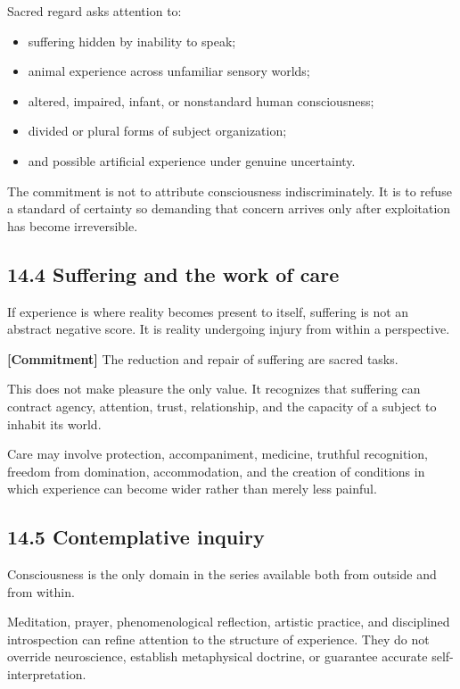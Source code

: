 \documentclass[
  11pt,
]{article}
\providecommand{\tightlist}{%
  \setlength{\itemsep}{0pt}\setlength{\parskip}{0pt}}
\begin{document}
Sacred regard asks attention to:

\begin{itemize}
\tightlist
\item
  suffering hidden by inability to speak;
\item
  animal experience across unfamiliar sensory worlds;
\item
  altered, impaired, infant, or nonstandard human consciousness;
\item
  divided or plural forms of subject organization;
\item
  and possible artificial experience under genuine uncertainty.
\end{itemize}

The commitment is not to attribute consciousness indiscriminately. It is
to refuse a standard of certainty so demanding that concern arrives only
after exploitation has become irreversible.

\subsection{14.4 Suffering and the work of
care}\label{suffering-and-the-work-of-care}

If experience is where reality becomes present to itself, suffering is
not an abstract negative score. It is reality undergoing injury from
within a perspective.

\textbf{{[}Commitment{]}} The reduction and repair of suffering are
sacred tasks.

This does not make pleasure the only value. It recognizes that suffering
can contract agency, attention, trust, relationship, and the capacity of
a subject to inhabit its world.

Care may involve protection, accompaniment, medicine, truthful
recognition, freedom from domination, accommodation, and the creation of
conditions in which experience can become wider rather than merely less
painful.

\subsection{14.5 Contemplative inquiry}\label{contemplative-inquiry}

Consciousness is the only domain in the series available both from
outside and from within.

Meditation, prayer, phenomenological reflection, artistic practice, and
disciplined introspection can refine attention to the structure of
experience. They do not override neuroscience, establish metaphysical
doctrine, or guarantee accurate self-interpretation.
\end{document}
